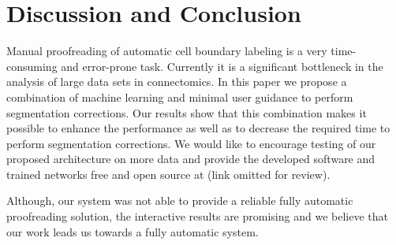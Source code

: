 \section{Discussion and Conclusion}

Manual proofreading of automatic cell boundary labeling is a very time-consuming and error-prone task. Currently it is a significant bottleneck in the analysis of large data sets in connectomics. In this paper we propose a combination of machine learning and minimal user guidance to perform segmentation corrections. Our results show that this combination makes it possible to enhance the performance as well as to decrease the required time to perform segmentation corrections. We would like to encourage testing of our proposed architecture on more data and provide the developed software and trained networks free and open source at (link omitted for review).%

Although, our system was not able to provide a reliable fully automatic proofreading solution, the interactive results are promising and we believe that our work leads us towards a fully automatic system. 




